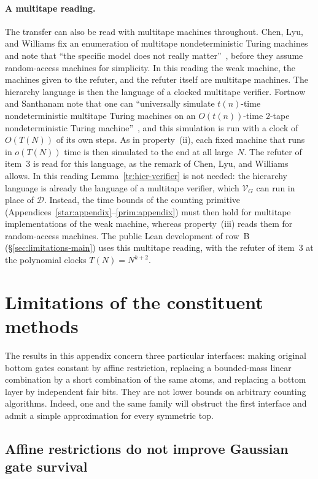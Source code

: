 \documentclass[11pt,letterpaper]{article}
\theoremstyle{definition}
\theoremstyle{remark}
\begin{document}
\paragraph{A multitape reading.} The transfer can also be read with
multitape machines throughout. Chen, Lyu, and Williams fix an
enumeration of multitape nondeterministic Turing machines and note that
``the specific model does not really matter''~\cite[Section~4.1]{CLW},
before they assume random-access machines for simplicity. In this
reading the weak machine, the machines given to the refuter, and the
refuter itself are multitape machines. The hierarchy language is then
the language of a clocked multitape verifier. Fortnow and Santhanam
note that one can ``universally simulate $t(n)$-time nondeterministic
multitape Turing machines on an $O(t(n))$-time 2-tape nondeterministic
Turing machine''~\cite[proof of Theorem~7.1]{FortnowSanthanam}, and this
simulation is run with a clock of $O(T(N))$ of its own steps. As in
property~(ii), each fixed machine that runs in $o(T(N))$ time is then
simulated to the end at all large~$N$. The refuter of item~3 is read
for this language, as the remark of Chen, Lyu, and Williams allows. In
this reading Lemma~\ref{tr:hier-verifier} is not needed: the hierarchy
language is already the language of a multitape verifier, which
$\mathcal V_G$ can run in place of $\mathcal D$. Instead, the time
bounds of the counting primitive
(Appendices~\ref{star:appendix}--\ref{prim:appendix}) must then hold
for multitape implementations of the weak machine, whereas
property~(iii) reads them for random-access machines. The public Lean
development of row~B (\S\ref{sec:limitations-main}) uses this multitape
reading, with the refuter of item~3 at the polynomial clocks
$T(N)=N^{k+2}$.


\section{Limitations of the constituent methods}
\label{lim:appendix}

The results in this appendix concern three particular interfaces: making
original bottom gates constant by affine restriction, replacing a bounded-mass
linear combination by a short combination of the same atoms, and replacing a
bottom layer by independent fair bits.  They are not lower bounds on arbitrary
counting algorithms.  Indeed, one and the same family will obstruct the first
interface and admit a simple approximation for every symmetric top.

\subsection{Affine restrictions do not improve Gaussian gate survival}
\label{lim:affine}
\end{document}
